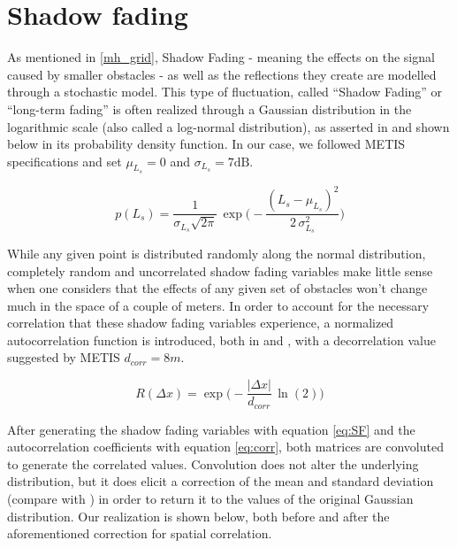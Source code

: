 \section{Shadow fading} \label{SF}
As mentioned in \ref{mh_grid}, Shadow Fading - meaning the effects on the signal caused by smaller obstacles - as well as the reflections they create are modelled through a stochastic model. This type of fluctuation, called ``Shadow Fading'' or ``long-term fading'' is often realized through a Gaussian distribution in the logarithmic scale (also called a log-normal distribution), as asserted in \cite{Forkel2004} and shown below in its probability density function. In our case, we followed METIS specifications and set $\mu_{L_s} = 0$ and $\sigma_{L_s} = 7 \text{dB}$.

\begin{equation} \label{eq:SF}
p(L_s) = \frac{1}{{\sigma_{L_s} \sqrt {2\pi } }}\,\exp\bigg(-\frac{(L_s - \mu_{L_s})^2}{2\,\sigma_{L_s}^2}\bigg)
\end{equation}

While any given point is distributed randomly along the normal distribution, completely random and uncorrelated shadow fading variables make little sense when one considers that the effects of any given set of obstacles won't change much in the space of a couple of meters. In order to account for the necessary correlation that these shadow fading variables experience, a normalized autocorrelation function is introduced, both in \cite{Forkel2004} and \cite{Raschkowski}, with a decorrelation value suggested by METIS $d_{corr} = 8 m$.

\begin{equation} \label{eq:corr}
R(\Delta x) = \exp\bigg(-\frac{|\Delta x|}{d_{corr}}\,\ln(2)\bigg)
\end{equation}

After generating the shadow fading variables with equation \ref{eq:SF} and the autocorrelation coefficients with equation \ref{eq:corr}, both matrices are convoluted to generate the correlated values. Convolution does not alter the underlying distribution, but it does elicit a correction of the mean and standard deviation (compare with \cite{Forkel2004}) in order to return it to the values of the original Gaussian distribution. Our realization is shown below, both before and after the aforementioned correction for spatial correlation.


